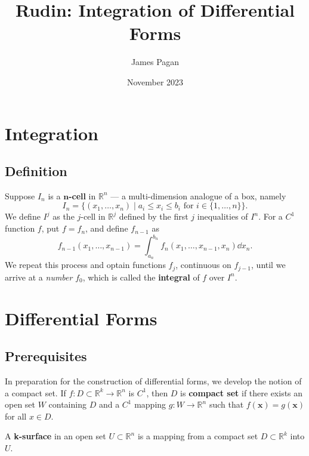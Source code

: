 \documentclass[11pt]{article}
\title{Rudin: Integration of Differential Forms}
\author{James Pagan}
\date{November 2023}
\renewcommand{\vec}[1]{\mathbf{#1}}
\begin{document}
\maketitle
\tableofcontents


\section{Integration}

\subsection{Definition}

Suppose $I_{n}$ is a $\mathbf{n}$\textbf{-cell} in $\mathbb{R}^{n}$ --- a multi-dimension analogue of a box, namely
\[
	I_{n} = \{ (x_{1}, \ldots, x_{n}) \mid a_{i} \le x_{i} \le b_{i} \text{ for } i \in \{ 1, \ldots, n \}\}.
\]
We define $I^{j}$ as the $j$-cell in $\mathbb{R}^{j}$ defined by the first $j$ inequalities of $I^{n}$. For a $C^{1}$ function $f$, put $f = f_{n}$, and define $f_{n - 1}$ as
\[
	f_{n - 1}(x_{1}, \ldots, x_{n - 1}) = \int_{a_{n}}^{b_{n}} f_{n}(x_{1}, \ldots, x_{n - 1}, x_{n}) \dd{x_{n}}.
\]
We repeat this process and optain functions $f_{j}$, continuous on $f_{j - 1}$, until we arrive at a \textit{number} $f_{0}$, which is called the \textbf{integral} of $f$ over $I^{n}$.


\section{Differential Forms}


\subsection{Prerequisites}

In preparation for the construction of differential forms, we develop the notion of a compact set. If $f : D \subset \mathbb{R}^{k} \to \mathbb{R}^{n}$ is $C^{1}$, then $D$ is \textbf{compact set} if there exists an open set $W$ containing $D$ and a $C^{1}$ mapping $g : W \to \mathbb{R}^{n}$ such that $f(\vec{x}) = g(\vec{x})$ for all $x \in D$.

A \textbf{k-surface} in an open set $U \subset \mathbb{R}^{n}$ is a mapping from a compact set $D \subset \mathbb{R}^{k}$ into $U$.
\end{document}
